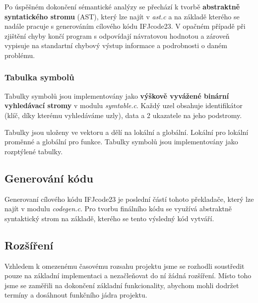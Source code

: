 \documentclass[a4paper, 12pt]{article} %
\begin{document}
            Po úspěšném dokončení sémantické 
            analýzy se přechází k tvorbě \textbf{abstraktně syntatického stromu} (AST), který lze najít v 
            \textit{ast.c} a na základě kterého se nadále pracuje s generováním cílového kódu IFJcode23. 
            V opačném případě při zjištění chyby končí program s odpovídají návratovou hodnotou a 
            zároveň vypisuje na standartní chybový výstup informace a podrobnosti o daném problému.


            \subsubsection{Tabulka symbolů}
                Tabulky symbolů jsou implementovány jako \textbf{výškově vyvážené binární vyhledávací 
                stromy}
                v modulu \textit{symtable.c}. Každý uzel obsahuje identifikátor (klíč, díky kterému 
                vyhledáváme uzly), data a 2 ukazatele na jeho podstromy.
                
                Tabulky jsou uloženy ve vektoru a dělí na lokální a globální. Lokální pro lokální 
                proměnné a globální pro funkce. Tabulky symbolů jsou implementovány jako rozptýlené 
                tabulky.

        \subsection{Generování kódu} \label{codegen}
            Generovaní cílového kódu IFJcode23 je poslední částí tohoto překladače, který lze najít 
            v modulu \textit{codegen.c}. Pro tvorbu finálního kódu se využívá abstraktně syntaktický strom
            na základě, kterého se tento výsledný kód vytváří. 

        \subsection{Rozšíření}
            Vzhledem k omezenému časovému rozsahu projektu jsme se rozhodli soustředit pouze na 
            základní implementaci a nezačleňovat do ní žádná rozšíření. Místo toho jsme se zaměřili 
            na dokončení základní funkcionality, abychom mohli dodržet termíny a dosáhnout funkčního 
            jádra projektu.
    
\end{document}
